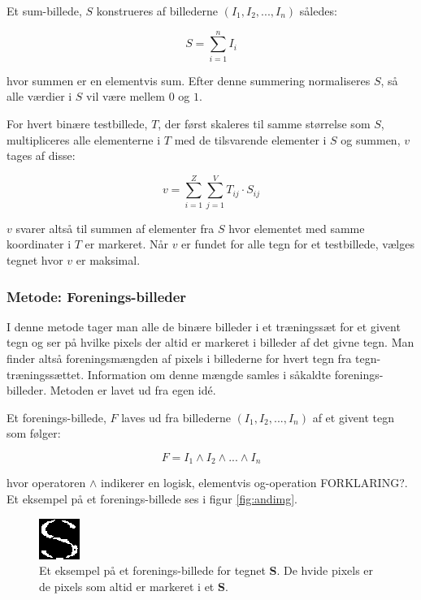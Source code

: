 Et sum-billede, $S$ konstrueres af billederne $(I_{1},I_{2},...,I_{n})$ således:

\begin{displaymath}
	S = \sum_{i=1}^n{I_i}
\end{displaymath}

hvor summen er en elementvis sum. Efter denne summering normaliseres $S$, så alle værdier i $S$ vil være mellem $0$ og $1$.

For hvert binære testbillede, $T$, der først skaleres til samme størrelse som $S$, multipliceres alle elementerne i $T$ med de tilsvarende elementer i $S$ og summen, $v$ tages af disse:

\begin{displaymath}
	v = \sum_{i=1}^Z{\sum_{j=1}^V{T_{ij} \cdot S_{ij}}}
\end{displaymath}

$v$ svarer altså til summen af elementer fra $S$ hvor elementet med samme koordinater i $T$ er markeret. Når $v$ er fundet for alle tegn for et testbillede, vælges tegnet hvor $v$ er maksimal.

\subsubsection*{Metode: Forenings-billeder}

I denne metode tager man alle de binære billeder i et træningssæt for et givent tegn og ser på hvilke pixels der altid er markeret i billeder af det givne tegn. Man finder altså foreningsmængden af pixels i billederne for hvert tegn fra tegn-træningssættet. Information om denne mængde samles i såkaldte forenings-billeder. Metoden er lavet ud fra egen idé.

Et forenings-billede, $F$ laves ud fra billederne $(I_{1},I_{2},...,I_{n})$ af et givent tegn som følger:

\begin{displaymath}
F = I_1 \wedge I_2 \wedge ... \wedge I_n
\end{displaymath}

hvor operatoren $\wedge$ indikerer en logisk, elementvis og-operation FORKLARING?. Et eksempel på et forenings-billede ses i figur \vref{fig:andimg}.

\begin{figure}[htp]
\centering
\includegraphics{system/illu/andimg.png} 
\caption{Et eksempel på et forenings-billede for tegnet \textbf{S}. De hvide pixels er de pixels som altid er markeret i et \textbf{S}.}
\label{fig:andimg}
\end{figure}

